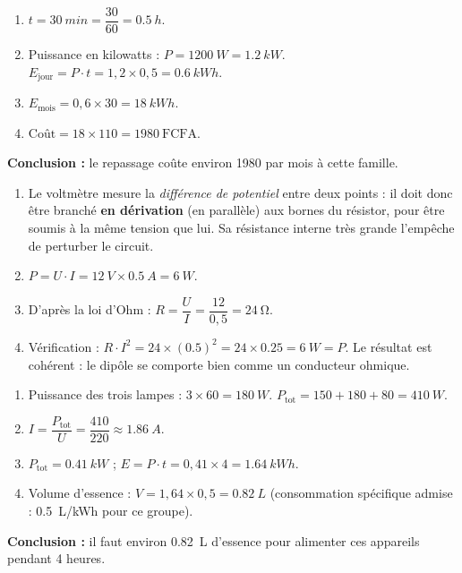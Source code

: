 \documentclass[11pt]{article}
\begin{document}
\begin{corrige}
\begin{enumerate}
\item $t = \SI{30}{min} = \dfrac{30}{60} = \SI{0,5}{h}$.
\item Puissance en kilowatts : $P = \SI{1200}{W} = \SI{1,2}{kW}$.
$E_{\text{jour}} = P \cdot t = 1,2 \times 0,5 = \SI{0,6}{kWh}$.
\item $E_{\text{mois}} = 0,6 \times 30 = \SI{18}{kWh}$.
\item $\text{Coût} = 18 \times 110 = \SI{1980}{\text{FCFA}}$.
\end{enumerate}
\textbf{Conclusion :} le repassage coûte environ \SI{1980}{} par mois à cette famille.
\end{corrige}

\begin{corrige}
\begin{enumerate}
\item Le voltmètre mesure la \emph{différence de potentiel} entre deux points : il doit donc être branché \textbf{en dérivation} (en parallèle) aux bornes du résistor, pour être soumis à la même tension que lui. Sa résistance interne très grande l'empêche de perturber le circuit.
\item $P = U \cdot I = \SI{12}{V} \times \SI{0,5}{A} = \SI{6}{W}$.
\item D'après la loi d'Ohm : $R = \dfrac{U}{I} = \dfrac{12}{0,5} = \SI{24}{\ohm}$.
\item Vérification : $R \cdot I^2 = 24 \times (\num{0,5})^2 = 24 \times \num{0,25} = \SI{6}{W} = P$. Le résultat est cohérent : le dipôle se comporte bien comme un conducteur ohmique.
\end{enumerate}
\end{corrige}

\begin{corrige}
\begin{enumerate}
\item Puissance des trois lampes : $3 \times 60 = \SI{180}{W}$.
$P_{\text{tot}} = 150 + 180 + 80 = \SI{410}{W}$.
\item $I = \dfrac{P_{\text{tot}}}{U} = \dfrac{410}{220} \approx \SI{1,86}{A}$.
\item $P_{\text{tot}} = \SI{0,41}{kW}$ ; $E = P \cdot t = 0,41 \times 4 = \SI{1,64}{kWh}$.
\item Volume d'essence : $V = 1,64 \times 0,5 = \SI{0,82}{L}$ (consommation spécifique admise : \SI{0,5}{L/kWh} pour ce groupe).
\end{enumerate}
\textbf{Conclusion :} il faut environ \SI{0,82}{L} d'essence pour alimenter ces appareils pendant 4 heures.
\end{corrige}
\end{document}
